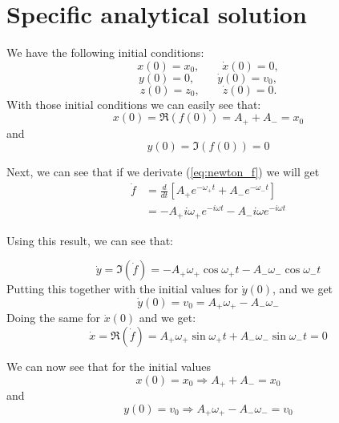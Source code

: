 \documentclass[english,notitlepage,reprint,nofootinbib]{revtex4-1}  %
\begin{document}
	
	\section{Specific analytical solution} \label{specific_anal}
	We have the following initial conditions:
	$$ x(0) = x_0, \qquad \dot{x}(0) = 0, $$
	$$ y(0) = 0, \qquad \dot{y}(0) = v_0, $$
	$$ z(0) = z_0, \qquad \dot{z}(0) = 0. $$
	With those initial conditions we can easily see that:
	\begin{equation*}
		x(0) = \Re \left( f(0) \right) = A_+ + A_- = x_0
	\end{equation*}
	and
	\begin{equation*}
		y(0) = \Im \left( f(0) \right) = 0
	\end{equation*}
	
	Next, we can see that if we derivate (\ref{eq:newton_f}) we will get
	\begin{align*}
		\dot{f} &= \frac{d}{dt} \left[ A_+ e^{- \omega_+ t} + A_- e^{- \omega_- t}  \right] \\
		&= -A_+ i \omega_+ e^{-i \omega t} - A_- i \omega e^{-i \omega t}
	\end{align*}
	
	Using this result, we can see that:
	
	\begin{equation*}
		\dot{y} = \Im( \dot{f} ) = -A_+ \omega_+ \cos \omega_+ t - A_- \omega_- \cos \omega_- t
	\end{equation*}
	Putting this together with the initial values for $\dot{y} (0)$, and we get
	\begin{equation*}
		\dot{y} (0) = v_0 = A_+ \omega_+ - A_- \omega_- 
	\end{equation*}
	Doing the same for $\dot{x} (0)$ and we get:
	\begin{equation*}
		\dot{x} = \Re ( \dot{f} ) = A_+ \omega_+ \sin \omega_+ t + A_- \omega_- \sin \omega_- t = 0
	\end{equation*}
	
	We can now see that for the initial values
	\begin{equation} \label{eq:i}
		x(0) = x_0 \Rightarrow A_+ + A_- = x_0
	\end{equation}
	and
	\begin{equation} \label{eq:ii}
		y(0) = v_0 \Rightarrow A_+ \omega_+ - A_- \omega_- = v_0
	\end{equation}
	
\end{document}
